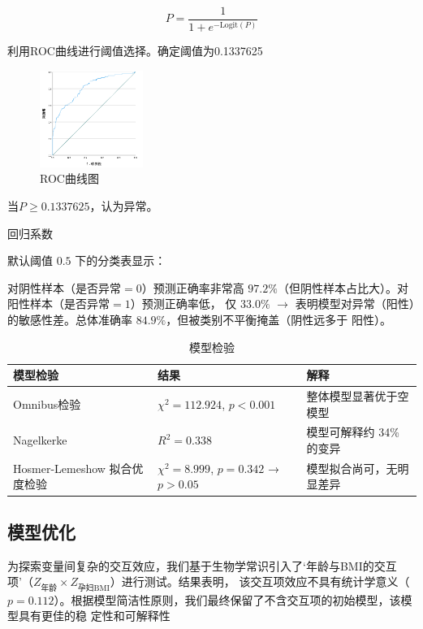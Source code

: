 \documentclass[withoutpreface,notoc]{cumcmthesis}
\begin{document}
	\begin{equation*}
	P = \frac{1}{1 + e^{-\mathrm{Logit}(P)}}
	\end{equation*}


	利用ROC曲线进行阈值选择。确定阈值为0.1337625
	\begin{figure}[ht]
		\centering
		\includegraphics[width=0.3\textwidth]{figures/ROC曲线.png} 
		\caption{ROC曲线图}
		\label{ROC曲线}
	\end{figure}

	当$P\geq0.1337625 $，认为异常。


	回归系数


	默认阈值 $0.5$ 下的分类表显示：

	对阴性样本（是否异常$=0$）预测正确率非常高 $97.2\%$（但阴性样本占比大）。对阳性样本（是否异常$=1$）预测正确率低，
	仅 $33.0\%$ $\rightarrow$ 表明模型对异常（阳性）的敏感性差。总体准确率 $84.9\%$，但被类别不平衡掩盖（阴性远多于
	阳性）。

	

	\begin{table}[!ht]
		\centering
		\caption{模型检验}
		\label{模型检验}
		\begin{tabular}{|l|l|l|}
		\hline
			模型检验 & 结果 & 解释 \\ \hline
			Omnibus检验 & $\chi^2 = 112.924$, $p < 0.001$ & 整体模型显著优于空模型 \\ \hline
			Nagelkerke & $R^2 = 0.338$ & 模型可解释约 34\% 的变异 \\ \hline
			Hosmer-Lemeshow 拟合优度检验 & $\chi^2 = 8.999$, $p = 0.342$ → $p > 0.05$ & 模型拟合尚可，无明显差异\\ \hline
		\end{tabular}
	\end{table}





	
	
	\subsection{模型优化}

	为探索变量间复杂的交互效应，我们基于生物学常识引入了‘年龄与BMI的交互项’（$Z_{\text{年龄}} \times Z_{\text{孕妇BMI}}$）进行测试。结果表明，
	该交互项效应不具有统计学意义（$p=0.112$）。根据模型简洁性原则，我们最终保留了不含交互项的初始模型，该模型具有更佳的稳
	定性和可解释性
\end{document}
